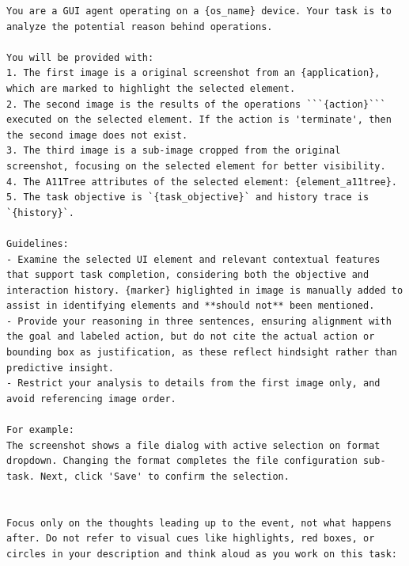 \begin{tcolorbox}[title=Prompt For Rationales in All Trajectories]
\scriptsize
\begin{Verbatim}[breaklines=true, breaksymbol={}]
You are a GUI agent operating on a {os_name} device. Your task is to analyze the potential reason behind operations.

You will be provided with:
1. The first image is a original screenshot from an {application}, which are marked to highlight the selected element.
2. The second image is the results of the operations ```{action}``` executed on the selected element. If the action is 'terminate', then the second image does not exist.
3. The third image is a sub-image cropped from the original screenshot, focusing on the selected element for better visibility.
4. The A11Tree attributes of the selected element: {element_a11tree}.
5. The task objective is `{task_objective}` and history trace is `{history}`.
                  
Guidelines:
- Examine the selected UI element and relevant contextual features that support task completion, considering both the objective and interaction history. {marker} higlighted in image is manually added to assist in identifying elements and **should not** been mentioned.
- Provide your reasoning in three sentences, ensuring alignment with the goal and labeled action, but do not cite the actual action or bounding box as justification, as these reflect hindsight rather than predictive insight.
- Restrict your analysis to details from the first image only, and avoid referencing image order.

For example:
The screenshot shows a file dialog with active selection on format dropdown. Changing the format completes the file configuration sub-task. Next, click 'Save' to confirm the selection.  


Focus only on the thoughts leading up to the event, not what happens after. Do not refer to visual cues like highlights, red boxes, or circles in your description and think aloud as you work on this task:
\end{Verbatim}
\end{tcolorbox}

